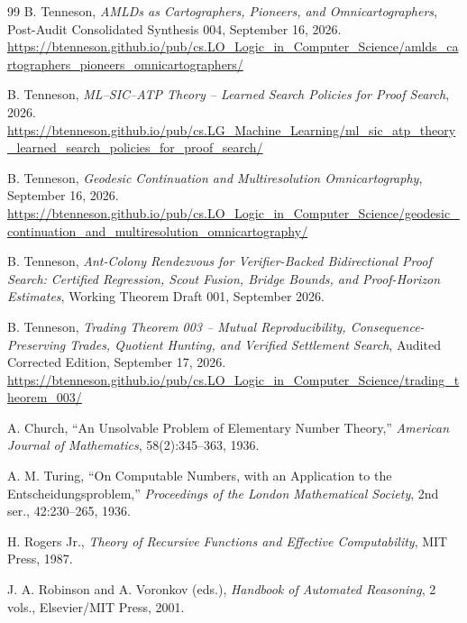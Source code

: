 \documentclass[11pt]{article}
\theoremstyle{definition}
\begin{document}
\begin{thebibliography}{99}
B. Tenneson, \emph{AMLDs as Cartographers, Pioneers, and Omnicartographers}, Post-Audit Consolidated Synthesis 004, September 16, 2026.\\
\url{https://btenneson.github.io/pub/cs.LO_Logic_in_Computer_Science/amlds_cartographers_pioneers_omnicartographers/}

B. Tenneson, \emph{ML--SIC--ATP Theory -- Learned Search Policies for Proof Search}, 2026.\\
\url{https://btenneson.github.io/pub/cs.LG_Machine_Learning/ml_sic_atp_theory_learned_search_policies_for_proof_search/}

B. Tenneson, \emph{Geodesic Continuation and Multiresolution Omnicartography}, September 16, 2026.\\
\url{https://btenneson.github.io/pub/cs.LO_Logic_in_Computer_Science/geodesic_continuation_and_multiresolution_omnicartography/}

B. Tenneson, \emph{Ant-Colony Rendezvous for Verifier-Backed Bidirectional Proof Search: Certified Regression, Scout Fusion, Bridge Bounds, and Proof-Horizon Estimates}, Working Theorem Draft 001, September 2026.

B. Tenneson, \emph{Trading Theorem 003 -- Mutual Reproducibility, Consequence-Preserving Trades, Quotient Hunting, and Verified Settlement Search}, Audited Corrected Edition, September 17, 2026.\\
\url{https://btenneson.github.io/pub/cs.LO_Logic_in_Computer_Science/trading_theorem_003/}

A. Church, ``An Unsolvable Problem of Elementary Number Theory,'' \emph{American Journal of Mathematics}, 58(2):345--363, 1936.

A. M. Turing, ``On Computable Numbers, with an Application to the Entscheidungsproblem,'' \emph{Proceedings of the London Mathematical Society}, 2nd ser., 42:230--265, 1936.

H. Rogers Jr., \emph{Theory of Recursive Functions and Effective Computability}, MIT Press, 1987.

J. A. Robinson and A. Voronkov (eds.), \emph{Handbook of Automated Reasoning}, 2 vols., Elsevier/MIT Press, 2001.
\end{thebibliography}
\end{document}
